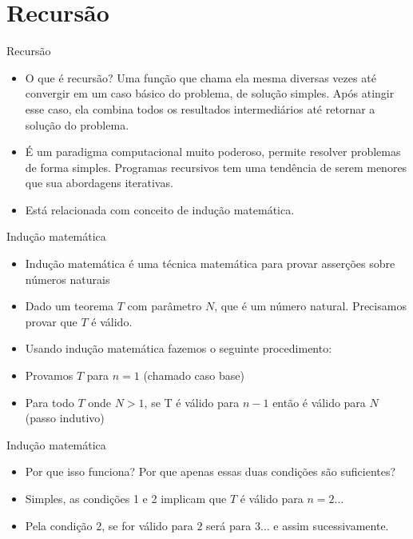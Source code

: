\section{Recursão}

\begin{frame}
	\begin{block}{Recursão}
		\begin{itemize}
			\item O que é recursão? Uma função que chama ela mesma diversas vezes até convergir em um caso básico do problema, de solução simples. Após atingir esse caso, ela combina todos os resultados intermediários até retornar a solução do problema.
			
			\item É um paradigma computacional muito poderoso, permite resolver problemas de forma simples. Programas recursivos tem uma tendência de serem menores que sua abordagens iterativas.
			
			\item Está relacionada com conceito de indução matemática.
		\end{itemize}
	\end{block}
\end{frame}


\begin{frame}
	\begin{block}{Indução matemática}
		\begin{itemize}
			\item Indução matemática é uma técnica matemática para provar asserções sobre números naturais

			\item Dado um teorema $T$ com parâmetro $N$, que é um número natural. Precisamos provar que $T$ é válido.
			
			\item Usando indução matemática fazemos o seguinte procedimento:
			
			\item Provamos $T$ para $n = 1$ (chamado caso base)
			
			\item Para todo $T$ onde $N > 1$, se T é válido para $n-1$ então é válido para $N$ (passo indutivo)
		\end{itemize}
	\end{block}
\end{frame}


\begin{frame}
	\begin{block}{Indução matemática}
		\begin{itemize}
			\item Por que isso funciona? Por que apenas essas duas condições são suficientes?
			
			\item Simples, as condições 1 e 2 implicam que $T$ é válido para $n = 2 \ldots$	
			
			\item Pela condição 2, se for válido para $2$ será para $3 \ldots$ e assim sucessivamente.
		\end{itemize}
	\end{block}
\end{frame}

